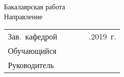 \thispagestyle{empty}
\begin{center}
\thesisOrganization
\end{center}

%
\vspace{0pt plus1fill} %
\begin{center}
{\thesisFacultyTitle} \\
{\thesisCafedrTitle} \\
\end{center}
%
\vspace{0pt plus8fill} %
\begin{center}
\textbf { %
\thesisTitle}

{%
Бакалаврская работа \\
Направление \thesisSpecialtyNumber \space
\thesisSpecialtyTitle
}

\vspace{0pt plus4fill} %
\end{center}
%
\vspace{0pt plus12fill} %
\begin{flushright}
	\begin{tabular}{lclll}
		Зав.~кафедрой 	& \underline{\hspace{2.4cm}} 	& \genCafedraRegaliaShort 	& \genCafedraFIOShort 	& \underline{\hspace{0.7cm}}.\underline{\hspace{0.7cm}}2019~г.	\\
		Обучающийся 	& \underline{\hspace{2.4cm}} 	&   						& \thesisAuthorShort 	& 						\\
		Руководитель 	& \underline{\hspace{2.4cm}} 	& \supervisorRegaliaShort	& \supervisorFioShort 	& 						\\
	\end{tabular}
	
\end{flushright}
%
\vspace{0pt plus8fill} %
{\centering\thesisCity~\thesisYear\par}
